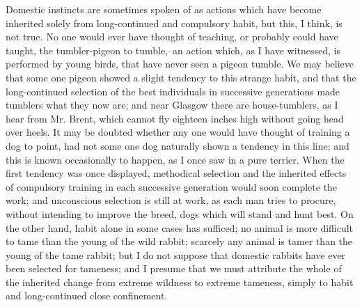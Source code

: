 Domestic instincts are sometimes spoken of as actions which have become inherited solely from long-continued and compulsory habit, but this, I think, is not true. No one would ever have thought of teaching, or probably could have taught, the tumbler-pigeon to tumble,--an action which, as I have witnessed, is performed by young birds, that have never seen a pigeon tumble. We may believe that some one pigeon showed a slight tendency to this strange habit, and that the long-continued selection of the best individuals in successive generations made tumblers what they now are; and near Glasgow there are house-tumblers, as I hear from Mr. Brent, which cannot fly eighteen inches high without going head over heels. It may be doubted whether any one would have thought of training a dog to point, had not some one dog naturally shown a tendency in this line; and this is known occasionally to happen, as I once saw in a pure terrier. When the first tendency was once displayed, methodical selection and the inherited effects of compulsory training in each successive generation would soon complete the work; and unconscious selection is still at work, as each man tries to procure, without intending to improve the breed, dogs which will stand and hunt best. On the other hand, habit alone in some cases has sufficed; no animal is more difficult to tame than the young of the wild rabbit; scarcely any animal is tamer than the young of the tame rabbit; but I do not suppose that domestic rabbits have ever been selected for tameness; and I presume that we must attribute the whole of the inherited change from extreme wildness to extreme tameness, simply to habit and long-continued close confinement.
